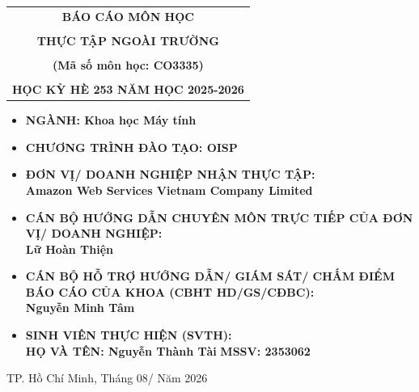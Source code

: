 \documentclass[a4paper,12pt]{article}
\newcommand{\cover}{\fontsize{15}{18}\selectfont}
\newcommand{\coverbig}{\fontsize{18}{22}\selectfont}
\newcommand{\coverlistspacing}{\setlength{\itemsep}{2pt}\setlength{\parskip}{0pt}\setlength{\parsep}{0pt}\setlength{\topsep}{0pt}}
\begin{document}
\begin{titlepage}
\begin{center}
\begin{tabular}{c}
\multicolumn{1}{c}{\textbf{{\coverbig BÁO CÁO MÔN HỌC}}}\\
\\{\textbf{{\coverbig THỰC TẬP NGOÀI TRƯỜNG}}}\\
\\{\textbf{{\coverbig (Mã số môn học: CO3335)}}}
\\
\\
\textbf{\cover HỌC KỲ HÈ 253 NĂM HỌC 2025-2026} \\
\end{tabular}
\end{center}
\vspace{0.2cm}
\begin{itemize}
\renewcommand\labelitemi{--}
\coverlistspacing
    \item \cover \textbf{NGÀNH: Khoa học Máy tính}
    \item \cover \textbf{CHƯƠNG TRÌNH ĐÀO TẠO: OISP}
\end{itemize}
\vspace{0.35cm}
\begin{itemize}
\renewcommand\labelitemi{--}
\coverlistspacing
    \item \cover \textbf{ĐƠN VỊ/ DOANH NGHIỆP NHẬN THỰC TẬP:}
    \\ \cover \textbf{Amazon Web Services Vietnam Company Limited}
    \item \cover \textbf{CÁN BỘ HƯỚNG DẪN CHUYÊN MÔN TRỰC TIẾP CỦA ĐƠN VỊ/ DOANH NGHIỆP:}
    \\ \cover \textbf{Lữ Hoàn Thiện}
    \item \cover \textbf{CÁN BỘ HỖ TRỢ HƯỚNG DẪN/ GIÁM SÁT/ CHẤM ĐIỂM BÁO CÁO CỦA KHOA (CBHT HD/GS/CĐBC):}
    \\ \cover \textbf{Nguyễn Minh Tâm}
    \item \cover \textbf{SINH VIÊN THỰC HIỆN (SVTH):}
    \\ \cover \textbf{HỌ VÀ TÊN: Nguyễn Thành Tài} \quad \textbf{MSSV: 2353062}
\end{itemize}
\enlargethispage{1.3cm}
\vfill
\begin{center}
{\cover TP. Hồ Chí Minh, Tháng 08/ Năm 2026}
\end{center}
\vspace{0.5cm}
\end{titlepage}
\end{document}

